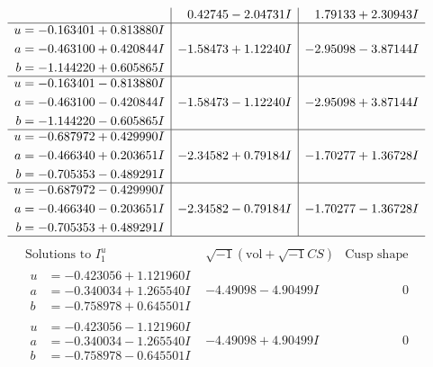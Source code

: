 \documentclass[1p]{elsarticle_modified}
\theoremstyle{definition}
\newcommand{\I}{\sqrt{-1}}
\begin{document}
$$\begin{array}{c|c|c}
 & \phantom{-}0.42745 - 2.04731 I & \phantom{-}1.79133 + 2.30943 I \\ \hline\begin{aligned}
u &= -0.163401 + 0.813880 I \\
a &= -0.463100 + 0.420844 I \\
b &= -1.144220 + 0.605865 I\end{aligned}
 & -1.58473 + 1.12240 I & -2.95098 - 3.87144 I \\ \hline\begin{aligned}
u &= -0.163401 - 0.813880 I \\
a &= -0.463100 - 0.420844 I \\
b &= -1.144220 - 0.605865 I\end{aligned}
 & -1.58473 - 1.12240 I & -2.95098 + 3.87144 I \\ \hline\begin{aligned}
u &= -0.687972 + 0.429990 I \\
a &= -0.466340 + 0.203651 I \\
b &= -0.705353 - 0.489291 I\end{aligned}
 & -2.34582 + 0.79184 I & -1.70277 + 1.36728 I \\ \hline\begin{aligned}
u &= -0.687972 - 0.429990 I \\
a &= -0.466340 - 0.203651 I \\
b &= -0.705353 + 0.489291 I\end{aligned}
 & -2.34582 - 0.79184 I & -1.70277 - 1.36728 I\\
 \hline 
 \end{array}$$\newpage$$\begin{array}{c|c|c}  
\text{Solutions to }I^u_{1}& \I (\text{vol} + \sqrt{-1}CS) & \text{Cusp shape}\\
 \hline 
\begin{aligned}
u &= -0.423056 + 1.121960 I \\
a &= -0.340034 + 1.265540 I \\
b &= -0.758978 + 0.645501 I\end{aligned}
 & -4.49098 - 4.90499 I & \phantom{-0.000000 } 0 \\ \hline\begin{aligned}
u &= -0.423056 - 1.121960 I \\
a &= -0.340034 - 1.265540 I \\
b &= -0.758978 - 0.645501 I\end{aligned}
 & -4.49098 + 4.90499 I & \phantom{-0.000000 } 0 \\ \hline\begin{aligned}

\end{aligned}
\end{array}$$
\end{document}
